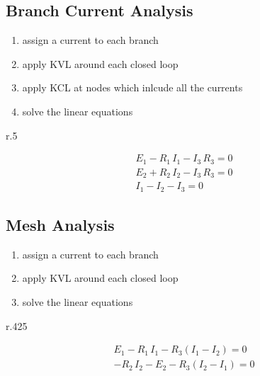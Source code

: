 
\subsection{Branch Current Analysis} %
	\begin{enumerate}
		\item assign a current to each branch
		\item apply KVL around each closed loop
		\item apply KCL at nodes which inlcude all the currents
		\item solve the linear equations
	\end{enumerate}
	
	\begin{wrapfigure}[0]{r}{.5\columnwidth}
		\vspace{-5mm}
	\end{wrapfigure}
	
	\begin{gather*}
		E_1 - R_1 \, I_1 - I_3\, R_3 = 0 \\
		E_2 + R_2 \, I_2 - I_3 \, R_3 = 0 \\
		I_1 - I_2 - I_3 = 0
	\end{gather*}

\subsection{Mesh Analysis} %
	
	\begin{enumerate}
		\item assign a current to each branch
		\item apply KVL around each closed loop
		\item solve the linear equations
	\end{enumerate}

	\begin{wrapfigure}[0]{r}{.425\columnwidth}
		\vspace{-7.5mm}
	\end{wrapfigure}
	\begin{gather*}
		E_1 - R_1 \, I_1 - R_3 (I_1-I_2) = 0 \\
		-R_2 \, I_2 - E_2 - R_3(I_2 - I_1) = 0
	\end{gather*}
	
